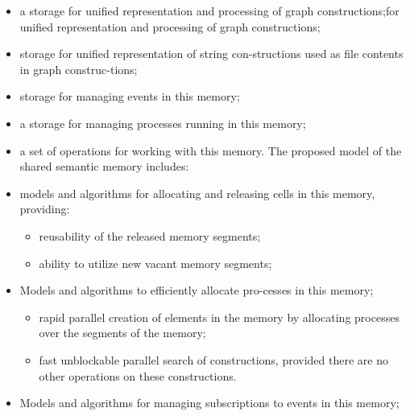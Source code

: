 \documentclass[10pt, a4paper]{article}
\begin{document}
\begin{multicols}{2}

\begin{itemize}
    \item   a storage for unified representation and processing
of graph constructions;for unified representation and processing
of graph constructions;
    \item storage for unified representation of string con-structions used as file contents in graph construc-tions;

    \item storage for managing events in this memory;
    
    \item a storage for managing processes running in this
memory;

   \item a set of operations for working with this memory.
The proposed model of the shared semantic memory includes:

\item models and algorithms for allocating and releasing
cells in this memory, providing:\setlength{\parskip}{0pt}
\setlength{\itemsep}{0pt}

\begin{itemize}[leftmargin=*]
 
    \item reusability of the released memory segments;\setlength{\parskip}{0pt}
\setlength{\itemsep}{0pt}
    \item ability to utilize new vacant memory segments;\setlength{\parskip}{0pt}
\setlength{\itemsep}{0pt}
\end{itemize} 

\item Models and algorithms to efficiently allocate pro-cesses in this memory;
\begin{itemize}[leftmargin=*]

    \item rapid parallel creation of elements in the memory
by allocating processes over the segments of the
memory;

    \item fast unblockable parallel search of constructions,
provided there are no other operations on these
constructions.

\end{itemize}

\item  Models and algorithms for managing subscriptions
to events in this memory;\setlength{\parskip}{0pt}
\setlength{\itemsep}{0pt}


\end{itemize}
\end{multicols}
\end{document}
